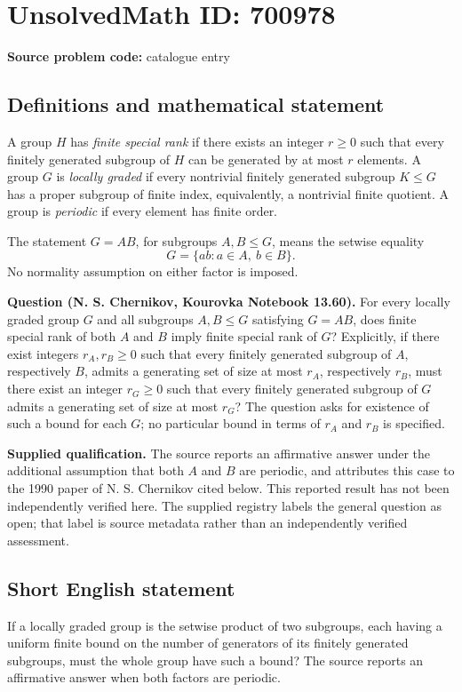 \documentclass[11pt]{article}
\begin{document}
\section*{UnsolvedMath ID: 700978}
\textbf{Source problem code:} catalogue entry
\subsection{Definitions and mathematical statement}
A group \(H\) has \emph{finite special rank} if there exists an integer \(r\geq 0\) such that every finitely generated subgroup of \(H\) can be generated by at most \(r\) elements. A group \(G\) is \emph{locally graded} if every nontrivial finitely generated subgroup \(K\leq G\) has a proper subgroup of finite index, equivalently, a nontrivial finite quotient. A group is \emph{periodic} if every element has finite order.

The statement \(G=AB\), for subgroups \(A,B\leq G\), means the setwise equality
\[
G=\{ab:a\in A,\ b\in B\}.
\]
No normality assumption on either factor is imposed.

\textbf{Question (N. S. Chernikov, Kourovka Notebook 13.60).} For every locally graded group \(G\) and all subgroups \(A,B\leq G\) satisfying \(G=AB\), does finite special rank of both \(A\) and \(B\) imply finite special rank of \(G\)? Explicitly, if there exist integers \(r_A,r_B\geq 0\) such that every finitely generated subgroup of \(A\), respectively \(B\), admits a generating set of size at most \(r_A\), respectively \(r_B\), must there exist an integer \(r_G\geq 0\) such that every finitely generated subgroup of \(G\) admits a generating set of size at most \(r_G\)? The question asks for existence of such a bound for each \(G\); no particular bound in terms of \(r_A\) and \(r_B\) is specified.

\textbf{Supplied qualification.} The source reports an affirmative answer under the additional assumption that both \(A\) and \(B\) are periodic, and attributes this case to the 1990 paper of N. S. Chernikov cited below. This reported result has not been independently verified here. The supplied registry labels the general question as open; that label is source metadata rather than an independently verified assessment.
\subsection{Short English statement}
If a locally graded group is the setwise product of two subgroups, each having a uniform finite bound on the number of generators of its finitely generated subgroups, must the whole group have such a bound? The source reports an affirmative answer when both factors are periodic.
\end{document}

